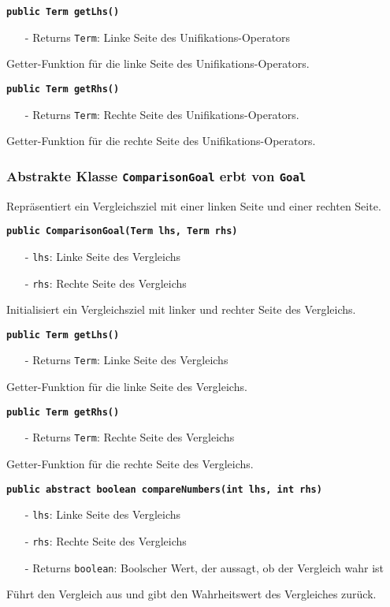 \documentclass[parskip=full,11pt,twoside]{scrartcl}
\begin{document}
\textbf{\texttt{public Term getLhs()}}
\begin{itemize}[noitemsep]
	\item[-] Returns \texttt{Term}: Linke Seite des Unifikations-Operators
\end{itemize}
Getter-Funktion für die linke Seite des Unifikations-Operators.

\textbf{\texttt{public Term getRhs()}}
\begin{itemize}[noitemsep]
	\item[-] Returns \texttt{Term}: Rechte Seite des Unifikations-Operators.
\end{itemize}
Getter-Funktion für die rechte Seite des Unifikations-Operators.

\subsubsection{Abstrakte Klasse \texttt{ComparisonGoal} erbt von \texttt{Goal}}
Repräsentiert ein Vergleichsziel mit einer linken Seite und einer rechten Seite.

\textbf{\texttt{public ComparisonGoal(Term lhs, Term rhs)}}
\begin{itemize}[noitemsep]
	\item[-] \texttt{lhs}: Linke Seite des Vergleichs
	\item[-] \texttt{rhs}: Rechte Seite des Vergleichs
\end{itemize}
Initialisiert ein Vergleichsziel mit linker und rechter Seite des Vergleichs.

\textbf{\texttt{public Term getLhs()}}
\begin{itemize}[noitemsep]
	\item[-] Returns \texttt{Term}: Linke Seite des Vergleichs
\end{itemize}
Getter-Funktion für die linke Seite des Vergleichs.

\textbf{\texttt{public Term getRhs()}}
\begin{itemize}[noitemsep]
	\item[-] Returns \texttt{Term}: Rechte Seite des Vergleichs
\end{itemize}
Getter-Funktion für die rechte Seite des Vergleichs.

\textbf{\texttt{public abstract boolean compareNumbers(int lhs, int rhs)}}
\begin{itemize}[noitemsep]
	\item[-] \texttt{lhs}: Linke Seite des Vergleichs
	\item[-] \texttt{rhs}: Rechte Seite des Vergleichs
	\item[-] Returns \texttt{boolean}: Boolscher Wert, der aussagt, ob der Vergleich wahr ist
\end{itemize}
Führt den Vergleich aus und gibt den Wahrheitswert des Vergleiches zurück.
\end{document}
